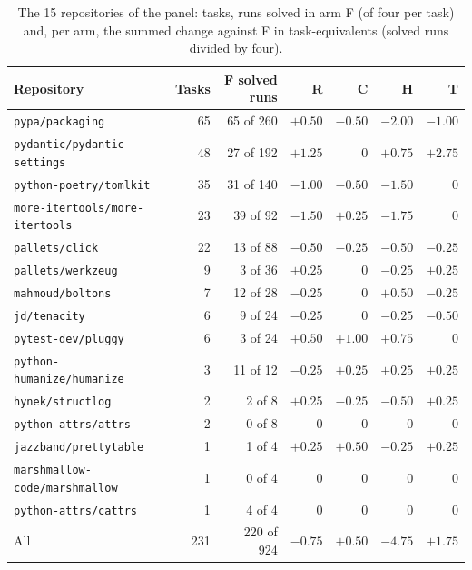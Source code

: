 \begin{table}[!htb]
\centering
\caption{The 15 repositories of the panel: tasks, runs solved in arm F (of four per task) and, per arm, the summed change against F in task-equivalents (solved runs divided by four).}\label{tab:s-repos}
\footnotesize
\begin{tabular}{lrrrrrr}
\toprule
Repository & Tasks & F solved runs & R & C & H & T \\
\midrule
\texttt{pypa/packaging} & 65 & 65 of 260 & ${+}0.50$ & ${-}0.50$ & ${-}2.00$ & ${-}1.00$ \\
\texttt{pydantic/pydantic-settings} & 48 & 27 of 192 & ${+}1.25$ & 0 & ${+}0.75$ & ${+}2.75$ \\
\texttt{python-poetry/tomlkit} & 35 & 31 of 140 & ${-}1.00$ & ${-}0.50$ & ${-}1.50$ & 0 \\
\texttt{more-itertools/more-itertools} & 23 & 39 of 92 & ${-}1.50$ & ${+}0.25$ & ${-}1.75$ & 0 \\
\texttt{pallets/click} & 22 & 13 of 88 & ${-}0.50$ & ${-}0.25$ & ${-}0.50$ & ${-}0.25$ \\
\texttt{pallets/werkzeug} & 9 & 3 of 36 & ${+}0.25$ & 0 & ${-}0.25$ & ${+}0.25$ \\
\texttt{mahmoud/boltons} & 7 & 12 of 28 & ${-}0.25$ & 0 & ${+}0.50$ & ${-}0.25$ \\
\texttt{jd/tenacity} & 6 & 9 of 24 & ${-}0.25$ & 0 & ${-}0.25$ & ${-}0.50$ \\
\texttt{pytest-dev/pluggy} & 6 & 3 of 24 & ${+}0.50$ & ${+}1.00$ & ${+}0.75$ & 0 \\
\texttt{python-humanize/humanize} & 3 & 11 of 12 & ${-}0.25$ & ${+}0.25$ & ${+}0.25$ & ${+}0.25$ \\
\texttt{hynek/structlog} & 2 & 2 of 8 & ${+}0.25$ & ${-}0.25$ & ${-}0.50$ & ${+}0.25$ \\
\texttt{python-attrs/attrs} & 2 & 0 of 8 & 0 & 0 & 0 & 0 \\
\texttt{jazzband/prettytable} & 1 & 1 of 4 & ${+}0.25$ & ${+}0.50$ & ${-}0.25$ & ${+}0.25$ \\
\texttt{marshmallow-code/marshmallow} & 1 & 0 of 4 & 0 & 0 & 0 & 0 \\
\texttt{python-attrs/cattrs} & 1 & 4 of 4 & 0 & 0 & 0 & 0 \\
\midrule
All & 231 & 220 of 924 & ${-}0.75$ & ${+}0.50$ & ${-}4.75$ & ${+}1.75$ \\
\bottomrule
\end{tabular}
\end{table}
